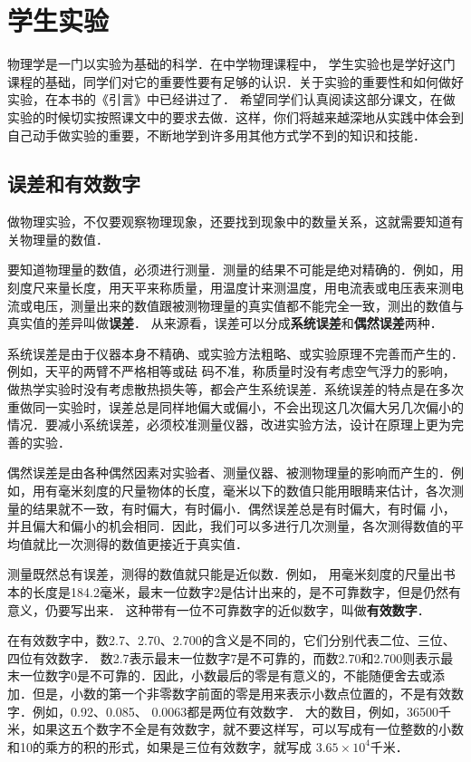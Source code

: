 \chapter{学生实验}

物理学是一门以实验为基础的科学．在中学物理课程中，
学生实验也是学好这门课程的基础，同学们对它的重要性要有足够的认识．关于实验的重要性和如何做好实验，在本书的《引言》中已经讲过了．
希望同学们认真阅读这部分课文，在做实验的时候切实按照课文中的要求去做．这样，你们将越来越深地从实践中体会到自己动手做实验的重要，不断地学到许多用其他方式学不到的知识和技能．
	
\section*{误差和有效数字}

做物理实验，不仅要观察物理现象，还要找到现象中的数量关系，这就需要知道有关物理量的数值．

要知道物理量的数值，必须进行测量．测量的结果不可能是绝对精确的．例如，用刻度尺来量长度，用天平来称质量，用温度计来测温度，用电流表或电压表来测电流或电压，测量出来的数值跟被测物理量的真实值都不能完全一致，测出的数值与真实值的差异叫做\textbf{误差}．
从来源看，误差可以分成\textbf{系统误差}和\textbf{偶然误差}两种．

系统误差是由于仪器本身不精确、或实验方法粗略、或实验原理不完善而产生的．例如，天平的两臂不严格相等或砝
码不准，称质量时没有考虑空气浮力的影响，做热学实验时没有考虑散热损失等，都会产生系统误差．系统误差的特点是在多次重做同一实验时，误差总是同样地偏大或偏小，不会出现这几次偏大另几次偏小的情况．要减小系统误差，必须校准测量仪器，改进实验方法，设计在原理上更为完善的实验．

偶然误差是由各种偶然因素对实验者、测量仪器、被测物理量的影响而产生的．例如，用有毫米刻度的尺量物体的长度，毫米以下的数值只能用眼睛来估计，各次测量的结果就不一致，有时偏大，有时偏小．偶然误差总是有时偏大，有时偏
小，并且偏大和偏小的机会相同．因此，我们可以多进行几次测量，各次测得数值的平均值就比一次测得的数值更接近于真实值．

测量既然总有误差，测得的数值就只能是近似数．例如，
用毫米刻度的尺量出书本的长度是184.2毫米，最末一位数字2是估计出来的，是不可靠数字，但是仍然有意义，仍要写出来．
这种带有一位不可靠数字的近似数字，叫做\textbf{有效数字}．

在有效数字中，数2.7、2.70、2.700的含义是不同的，它们分别代表二位、三位、四位有效数字．
数2.7表示最末一位数字7是不可靠的，而数2.70和2.700则表示最末一位数字0是不可靠的．因此，小数最后的零是有意义的，不能随便舍去或添加．但是，小数的第一个非零数字前面的零是用来表示小数点位置的，不是有效数字．例如，0.92、0.085、 0.0063都是两位有效数字．
大的数目，例如，36500千米，如果这五个数字不全是有效数字，就不要这样写，可以写成有一位整数的小数和10的乘方的积的形式，如果是三位有效数字，就写成
$3.65\times 10^4$千米．

